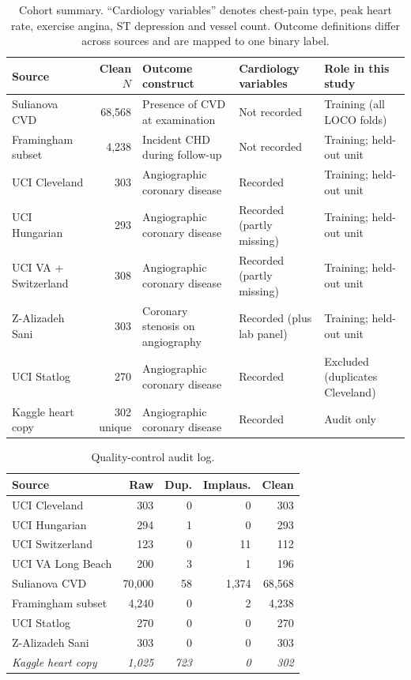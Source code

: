 \documentclass[journal]{IEEEtran}
\begin{document}
\begin{table}[t]
\caption{Cohort summary. ``Cardiology variables'' denotes chest-pain type, peak heart rate, exercise angina, ST depression and vessel count. Outcome definitions differ across sources and are mapped to one binary label.}
\label{tab:cohorts}
\centering\footnotesize
\begin{tabular}{p{3.2cm}rp{4.6cm}p{2.9cm}p{3.6cm}}
\toprule
Source & Clean $N$ & Outcome construct & Cardiology variables & Role in this study\\
\midrule
Sulianova CVD & 68{,}568 & Presence of CVD at examination & Not recorded & Training (all LOCO folds)\\
Framingham subset & 4{,}238 & Incident CHD during follow-up & Not recorded & Training; held-out unit\\
UCI Cleveland & 303 & Angiographic coronary disease & Recorded & Training; held-out unit\\
UCI Hungarian & 293 & Angiographic coronary disease & Recorded (partly missing) & Training; held-out unit\\
UCI VA + Switzerland & 308 & Angiographic coronary disease & Recorded (partly missing) & Training; held-out unit\\
Z-Alizadeh Sani & 303 & Coronary stenosis on angiography & Recorded (plus lab panel) & Training; held-out unit\\
UCI Statlog & 270 & Angiographic coronary disease & Recorded & Excluded (duplicates Cleveland)\\
Kaggle heart copy & 302 unique & Angiographic coronary disease & Recorded & Audit only\\
\bottomrule
\end{tabular}
\end{table}

\begin{table}[t]
\caption{Quality-control audit log.}
\label{tab:audit}
\centering\footnotesize
\begin{tabular}{lrrrr}
\toprule
Source & Raw & Dup. & Implaus. & Clean\\
\midrule
UCI Cleveland & 303 & 0 & 0 & 303\\
UCI Hungarian & 294 & 1 & 0 & 293\\
UCI Switzerland & 123 & 0 & 11 & 112\\
UCI VA Long Beach & 200 & 3 & 1 & 196\\
Sulianova CVD & 70{,}000 & 58 & 1{,}374 & 68{,}568\\
Framingham subset & 4{,}240 & 0 & 2 & 4{,}238\\
UCI Statlog & 270 & 0 & 0 & 270\\
Z-Alizadeh Sani & 303 & 0 & 0 & 303\\
\midrule
\emph{Kaggle heart copy} & \emph{1{,}025} & \emph{723} & \emph{0} & \emph{302}\\
\bottomrule
\end{tabular}
\end{table}
\end{document}
